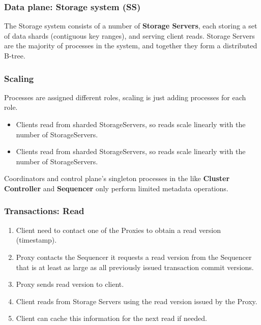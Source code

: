 

\begin{frame}
	\frametitle{Data plane: Storage system (SS)}
The Storage system consists of a number of \textbf{Storage Servers}, each
storing a set of data shards (contiguous key ranges),
and serving client reads. Storage Servers are the majority of processes in the system, and together they form a distributed B-tree.
	
\end{frame}

\begin{frame}
	\frametitle{Scaling}
Processes are assigned different roles, scaling is just adding processes for each role. \\

\begin{itemize}
    \item Clients read from sharded StorageServers, so reads scale
linearly with the number of StorageServers. 
\item Clients read from sharded StorageServers, so reads scale
linearly with the number of StorageServers. 
\end{itemize}

Coordinators and control plane's singleton processes in the  like \textbf{Cluster Controller} and \textbf{Sequencer} only perform limited metadata operations.
	
\end{frame}


\begin{frame}
	\frametitle{Transactions: Read}
\begin{enumerate}
    \item Client need to contact one of the Proxies to obtain a read version (timestamp).
    \item Proxy contacts the Sequencer it requests a read version from the Sequencer that is at least as large as all previously issued transaction commit versions.
    \item Proxy sends read version to client.
    \item Client reads from Storage Servers using the read version issued by the Proxy.
    \item Client can cache this information for the next read if needed.
\end{enumerate}

\end{frame}

